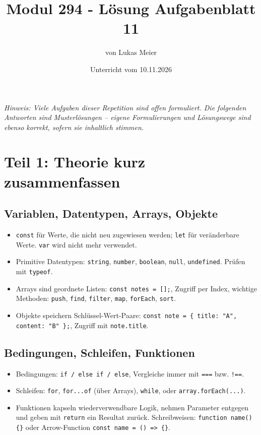 \documentclass[a4paper,12pt]{article}
\title{Modul 294 - Lösung Aufgabenblatt 11}
\author{von Lukas Meier}
\date{Unterricht vom 10.11.2026}
\begin{document}
\maketitle

\textit{Hinweis: Viele Aufgaben dieser Repetition sind offen formuliert. Die folgenden Antworten sind Musterlösungen -- eigene Formulierungen und Lösungswege sind ebenso korrekt, sofern sie inhaltlich stimmen.}

\section{Teil 1: Theorie kurz zusammenfassen}

\subsection*{Variablen, Datentypen, Arrays, Objekte}
\begin{itemize}
    \item \texttt{const} für Werte, die nicht neu zugewiesen werden; \texttt{let} für veränderbare Werte. \texttt{var} wird nicht mehr verwendet.
    \item Primitive Datentypen: \texttt{string}, \texttt{number}, \texttt{boolean}, \texttt{null}, \texttt{undefined}. Prüfen mit \texttt{typeof}.
    \item Arrays sind geordnete Listen: \texttt{const notes = [];}, Zugriff per Index, wichtige Methoden: \texttt{push}, \texttt{find}, \texttt{filter}, \texttt{map}, \texttt{forEach}, \texttt{sort}.
    \item Objekte speichern Schlüssel-Wert-Paare: \texttt{const note = \{ title: "A", content: "B" \};}, Zugriff mit \texttt{note.title}.
\end{itemize}

\subsection*{Bedingungen, Schleifen, Funktionen}
\begin{itemize}
    \item Bedingungen: \texttt{if / else if / else}, Vergleiche immer mit \texttt{===} bzw. \texttt{!==}.
    \item Schleifen: \texttt{for}, \texttt{for...of} (über Arrays), \texttt{while}, oder \texttt{array.forEach(...)}.
    \item Funktionen kapseln wiederverwendbare Logik, nehmen Parameter entgegen und geben mit \texttt{return} ein Resultat zurück. Schreibweisen: \texttt{function name() \{\}} oder Arrow-Function \texttt{const name = () => \{\}}.
\end{itemize}
\end{document}
